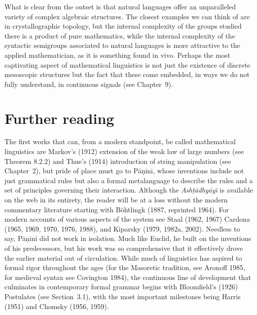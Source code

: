 What is clear from the outset is that natural languages offer an unparalleled
variety of complex algebraic structures. The closest examples we can think of
are in crystallographic topology, but the internal complexity of the groups
studied there is a product of pure mathematics, while the internal complexity
of the syntactic semigroups associated to natural languages is more attractive
to the applied mathematician, as it is something found in vivo.  Perhaps the
most captivating aspect of mathematical linguistics is not just the existence
of discrete mesoscopic structures but the fact that these come embedded, in
ways we do not fully understand, in continuous signals (see Chapter~9). 

\section{Further reading}

The first works that can, from a modern standpoint, be called mathematical
linguistics are Markov's (1912) extension of the weak law of large numbers
(see Theorem 8.2.2) and Thue's (1914) introduction of string manipulation (see
Chapter~2), but pride of place must go to P\={a}\d{n}ini, whose inventions
include not just grammatical rules but also a formal metalanguage to describe
the rules and a set of principles governing their interaction.  Although the
{\it Ash\d{t}\={a}dhy\={a}y\={\i}} is available on the web in its entirety,
the reader will be at a loss without the modern commentary literature starting
with B\"{o}htlingk (1887, reprinted 1964). For modern accounts of various
aspects of the system see Staal (1962, 1967) Cardona (1965, 1969, 1970, 1976,
1988), and Kiparsky (1979, 1982a, 2002). Needless to
say, P\={a}\d{n}ini did not work in isolation. Much like Euclid, he built on
the inventions of his predecessors, but his work was so comprehensive that it
effectively drove the earlier material out of circulation.  While much of
linguistics has aspired to formal rigor throughout the ages (for the Masoretic
tradition, see Aronoff 1985, for medieval syntax see Covington 1984), the
continuous line of development that culminates in contemporary formal grammar
begins with Bloomfield's (1926) Postulates (see Section~3.1), with the most
important milestones being Harris (1951) and Chomsky (1956,
1959).\nocite{Covington:1984}\nocite{Bo2htlingk:1964}

